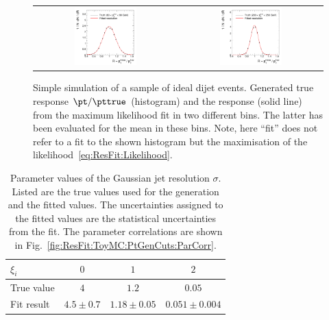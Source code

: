 \begin{figure}[ht]
\centering
\begin{tabular}{cc}
  \includegraphics[width=0.45\textwidth]{figures/resFit_ToyMC_PtGenCuts_ResolutionBin1} &
  \includegraphics[width=0.45\textwidth]{figures/resFit_ToyMC_PtGenCuts_ResolutionBin7} \\      
\end{tabular}
\caption{Simple simulation of a sample of ideal dijet events.
  Generated true response \mbox{$\pt / \pttrue$} (histogram) and
  the response (solid line) from the maximum likelihood fit in two
  different \pttrue bins.
  The latter has been evaluated for the mean \pttrue in these bins.
  Note, here ``fit'' does not refer to a fit to the shown histogram but the maximisation of the likelihood~\eqref{eq:ResFit:Likelihood}.
}
\label{fig:ResFit:ToyMC:PtGenCuts:Response}
\end{figure}


\begin{table}[ht]
  \caption{Parameter values of the Gaussian jet \pt resolution
    $\sigma$.
    Listed are the true values used for the generation and
    the fitted values.
    The uncertainties assigned to the fitted values
    are the statistical uncertainties from the fit.
    The parameter correlations are shown in Fig.~\ref{fig:ResFit:ToyMC:PtGenCuts:ParCorr}.}
  \centering
  \begin{tabular}[ht]{lccc}
    \toprule
    $\xi_{i}$ & $0$ & $1$ & $2$ \\
    \midrule
    True value & $4$           & $1.2$           & $0.05$ \\
    Fit result & $4.5 \pm 0.7$ & $1.18 \pm 0.05$ & $0.051 \pm 0.004$ \\
    \bottomrule
  \end{tabular}
  \label{tab:ResFit:ToyMC:PtGenCuts:FitResult}
\end{table}


